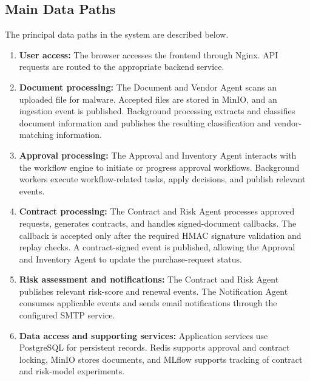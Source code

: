 \documentclass[12pt,a4paper]{report}
\begin{document}
\subsection{Main Data Paths}

The principal data paths in the system are described below.

\begin{enumerate}[label=\arabic*.]
    \item \textbf{User access:}
    The browser accesses the frontend through Nginx. API requests
    are routed to the appropriate backend service.

    \item \textbf{Document processing:}
    The Document and Vendor Agent scans an uploaded file for
    malware. Accepted files are stored in MinIO, and an ingestion
    event is published. Background processing extracts and
    classifies document information and publishes the resulting
    classification and vendor-matching information.

    \item \textbf{Approval processing:}
    The Approval and Inventory Agent interacts with the workflow
    engine to initiate or progress approval workflows. Background
    workers execute workflow-related tasks, apply decisions, and
    publish relevant events.

    \item \textbf{Contract processing:}
    The Contract and Risk Agent processes approved requests,
    generates contracts, and handles signed-document callbacks.
    The callback is accepted only after the required HMAC
    signature validation and replay checks. A contract-signed
    event is published, allowing the Approval and Inventory
    Agent to update the purchase-request status.

    \item \textbf{Risk assessment and notifications:}
    The Contract and Risk Agent publishes relevant risk-score
    and renewal events. The Notification Agent consumes
    applicable events and sends email notifications through
    the configured SMTP service.

    \item \textbf{Data access and supporting services:}
    Application services use PostgreSQL for persistent records.
    Redis supports approval and contract locking, MinIO stores
    documents, and MLflow supports tracking of contract and
    risk-model experiments.
\end{enumerate}
\end{document}
